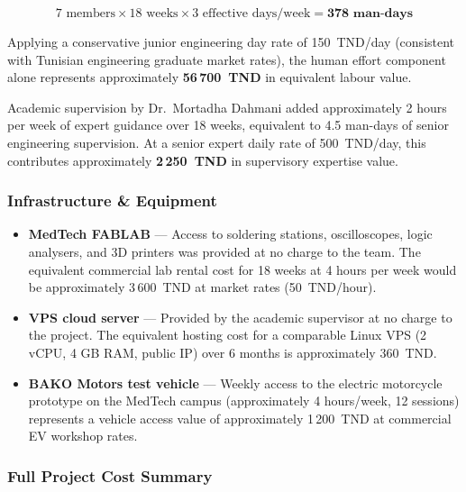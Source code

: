 \[
7 \text{ members} \times 18 \text{ weeks} \times 3 \text{ effective days/week} = \mathbf{378 \text{ man-days}}
\]

Applying a conservative junior engineering day rate of 150~TND/day (consistent with Tunisian engineering graduate market rates), the human effort component alone represents approximately \textbf{56\,700~TND} in equivalent labour value.

Academic supervision by Dr.\ Mortadha Dahmani added approximately 2 hours per week of expert guidance over 18 weeks, equivalent to 4.5 man-days of senior engineering supervision. At a senior expert daily rate of 500~TND/day, this contributes approximately \textbf{2\,250~TND} in supervisory expertise value.

\subsubsection*{Infrastructure \& Equipment}

\begin{itemize}
    \item \textbf{MedTech FABLAB} --- Access to soldering stations, oscilloscopes, logic analysers, and 3D printers was provided at no charge to the team. The equivalent commercial lab rental cost for 18 weeks at 4 hours per week would be approximately 3\,600~TND at market rates (50~TND/hour).
    \item \textbf{VPS cloud server} --- Provided by the academic supervisor at no charge to the project. The equivalent hosting cost for a comparable Linux VPS (2 vCPU, 4 GB RAM, public IP) over 6 months is approximately 360~TND.
    \item \textbf{BAKO Motors test vehicle} --- Weekly access to the electric motorcycle prototype on the MedTech campus (approximately 4 hours/week, 12 sessions) represents a vehicle access value of approximately 1\,200~TND at commercial EV workshop rates.
\end{itemize}

\subsubsection*{Full Project Cost Summary}

